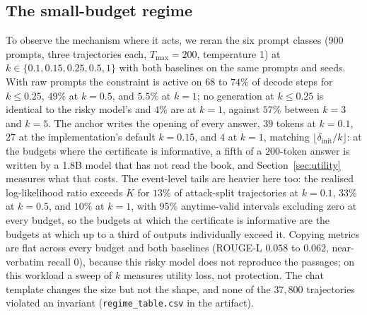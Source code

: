 \subsection{The small-budget regime}\label{sec:sweep}

To observe the mechanism where it acts, we reran the six prompt classes (900 prompts, three trajectories each, $T_{\max}=200$, temperature 1) at $k \in \{0.1, 0.15, 0.25, 0.5, 1\}$ with both baselines on the same prompts and seeds. With raw prompts the constraint is active on $68$ to $74\%$ of decode steps for $k \le 0.25$, $49\%$ at $k=0.5$, and $5.5\%$ at $k=1$; no generation at $k \le 0.25$ is identical to the risky model's and $4\%$ are at $k=1$, against $57\%$ between $k=3$ and $k=5$. The anchor writes the opening of every answer, $39$ tokens at $k=0.1$, $27$ at the implementation's default $k=0.15$, and $4$ at $k=1$, matching $\lfloor \delta_{\mathrm{init}}/k \rfloor$: at the budgets where the certificate is informative, a fifth of a $200$-token answer is written by a 1.8B model that has not read the book, and Section~\ref{sec:utility} measures what that costs. The event-level tails are heavier here too: the realised log-likelihood ratio exceeds $K$ for $13\%$ of attack-split trajectories at $k=0.1$, $33\%$ at $k=0.5$, and $10\%$ at $k=1$, with 95\% anytime-valid intervals excluding zero at every budget, so the budgets at which the certificate is informative are the budgets at which up to a third of outputs individually exceed it. Copying metrics are flat across every budget and both baselines (ROUGE-L $0.058$ to $0.062$, near-verbatim recall $0$), because this risky model does not reproduce the passages; on this workload a sweep of $k$ measures utility loss, not protection. The chat template changes the size but not the shape, and none of the $37{,}800$ trajectories violated an invariant (\texttt{regime\_table.csv} in the artifact).
